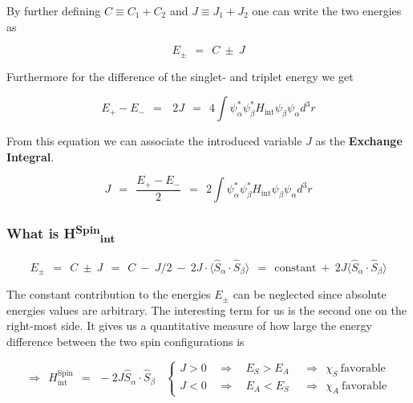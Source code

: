 \documentclass[10pt]{report}
\numberwithin{equation}{chapter}
\begin{document}
By further defining $C \equiv C_1+C_2$ and $J \equiv J_1+J_2$ one can write the two energies as

\begin{equation}
  E_\pm ~~=~~ C ~\pm~ J
\end{equation}

Furthermore for the difference of the singlet- and triplet energy we get

\begin{equation}
  E_+ - E_- ~~=~~~2J ~~=~~ 4 \int \psi^*_\alpha \psi^*_\beta H_\text{int} \psi_\beta \psi_\alpha d^3r
\end{equation}

From this equation we can associate the introduced variable $J$ as the \textbf{Exchange Integral}.

\begin{equation}
  J ~~=~~ \frac{E_+-E_-}{2} ~~=~~ 2 \int \psi^*_\alpha \psi^*_\beta H_\text{int} \psi_\beta \psi_\alpha d^3r
\end{equation}


\subsubsection{What is H\textsuperscript{Spin}\textsubscript{int}}

\begin{equation}
  E_\pm ~~=~~ C ~\pm~ J 
  ~~=~~ C ~-~ J/2 ~-~ 2J \cdot \langle \hat{S}_\alpha \cdot \hat{S}_\beta \rangle 
  ~~=~~ \text{constant} ~+~ 2J \langle \hat{S}_\alpha \cdot \hat{S}_\beta \rangle
\end{equation}

The constant contribution to the energies $E_\pm$ can be neglected since absolute energies values are arbitrary. The interesting term for us is the second one on the right-most side. It gives us a quantitative measure of how large the energy difference between the two spin configurations is

\begin{equation}
  \Rightarrow ~~ H^\text{Spin}_\text{int} ~~=~~ - 2J \hat{S}_\alpha \cdot \hat{S}_\beta ~~~~ \left\{
  \begin{array}{lccr}
    J > 0 & ~~ \Rightarrow ~~ & E_S > E_A & ~~\Rightarrow~~ \chi_S\ \text{favorable}\\
    J < 0 & ~~ \Rightarrow ~~ & E_A < E_S & ~~\Rightarrow~~ \chi_A\ \text{favorable}
  \end{array}\right.
\end{equation}
\end{document}

